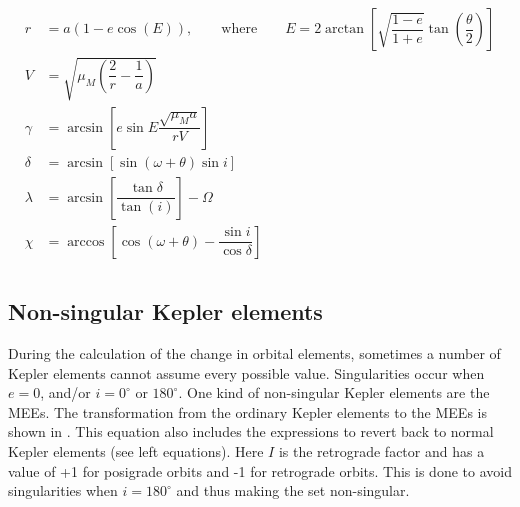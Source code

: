 \begin{equation} \label{eq:kepltospher}
\begin{split}
r&= a\left(1-e\cos\left(E\right)\right), \qquad \text{where} \qquad E=2\arctan\left[\sqrt{\dfrac{1-e}{1+e}}\tan\left(\dfrac{\theta}{2}\right)\right]\\
V&=\sqrt{\mu_{M}\left(\dfrac{2}{r}-\dfrac{1}{a}\right)}\\
\gamma&=\arcsin\left[e\sin E\dfrac{\sqrt{\mu_{M}a}}{rV}\right]\\
\delta&=\arcsin\left[\sin\left(\omega+\theta\right)\sin i\right]\\
\lambda&=\arcsin\left[\dfrac{\tan\delta }{\tan\left(i\right)}\right]-\Omega\\
\chi&=\arccos\left[\cos\left(\omega+\theta\right)-\dfrac{\sin i}{\cos\delta }\right]\\
\end{split}
\end{equation} 


\subsection{Non-singular Kepler elements}
\label{subsec:nosingkep}
During the calculation of the change in orbital elements, sometimes a number of Kepler elements cannot assume every possible value. Singularities occur when $e=0$, and/or $i=0^{\circ}$ or $180^{\circ}$. One kind of non-singular Kepler elements are the \ac{MEE}s. The transformation from the ordinary Kepler elements to the \ac{MEE}s is shown in . This equation also includes the expressions to revert back to normal Kepler elements (see left equations). Here  $I$ is the retrograde factor and has a value of +1 for posigrade orbits and -1 for retrograde orbits. This is done to avoid singularities when $i=180^{\circ}$ and thus making the set non-singular. 




